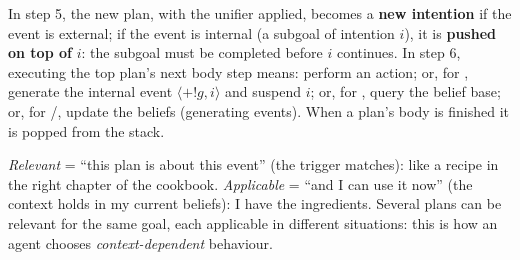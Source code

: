 In step 5, the new plan, with the unifier applied, becomes a \textbf{new intention} if the
event is external; if the event is internal (a subgoal  of intention $i$), it is
\textbf{pushed on top of} $i$: the subgoal must be completed before $i$ continues. In step 6,
executing the top plan's next body step means: perform an action; or, for ,
generate the internal event $\langle +!g, i \rangle$ and suspend $i$; or, for ,
query the belief base; or, for /, update the beliefs (generating events).
When a plan's body is finished it is popped from the stack.

\begin{nbintuition}
\emph{Relevant} = ``this plan is about this event'' (the trigger matches): like a recipe in
the right chapter of the cookbook. \emph{Applicable} = ``and I can use it now'' (the context
holds in my current beliefs): I have the ingredients. Several plans can be relevant for the
same goal, each applicable in different situations: this is how an agent chooses
\emph{context-dependent} behaviour.
\end{nbintuition}
